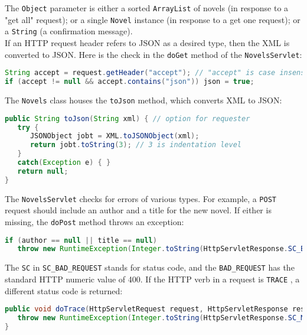 \documentclass[12pt]{article}
\begin{document}
The \verb|Object| parameter is either a sorted \verb|ArrayList| of novels (in response to a "get all" request); or a single \verb|Novel| instance (in response to a get one request); or a \verb|String| (a confirmation message).\\

If an HTTP request header refers to JSON as a desired type, then the XML is converted to JSON. Here is the check in the \verb|doGet| method of the \verb|NovelsServlet|:\\

\begin{lstlisting}[language=java]
String accept = request.getHeader("accept"); // "accept" is case insensitive
if (accept != null && accept.contains("json")) json = true;

\end{lstlisting}

The \verb|Novels| class houses the \verb|toJson| method, which converts XML to JSON:\\

\begin{lstlisting}[language=java]
public String toJson(String xml) { // option for requester
   try {
      JSONObject jobt = XML.toJSONObject(xml);
      return jobt.toString(3); // 3 is indentation level
   }
   catch(Exception e) { }
   return null;
}

\end{lstlisting}

The \verb|NovelsServlet| checks for errors of various types. For example, a \verb|POST| request should include an author and a title for the new novel. If either is missing, the \verb|doPost| method throws an exception:\\

\begin{lstlisting}[language=java]
if (author == null || title == null)
   throw new RuntimeException(Integer.toString(HttpServletResponse.SC_BAD_REQUEST));

\end{lstlisting}

The \verb|SC| in \verb|SC_BAD_REQUEST| stands for status code, and the \verb|BAD_REQUEST| has the standard HTTP numeric value of 400. If the HTTP verb in a request is \verb|TRACE| , a different status code is returned:\\

\begin{lstlisting}[language=java]
public void doTrace(HttpServletRequest request, HttpServletResponse response) {
   throw new RuntimeException(Integer.toString(HttpServletResponse.SC_METHOD_NOT_ALLOWED));
}

\end{lstlisting}
\end{document}
